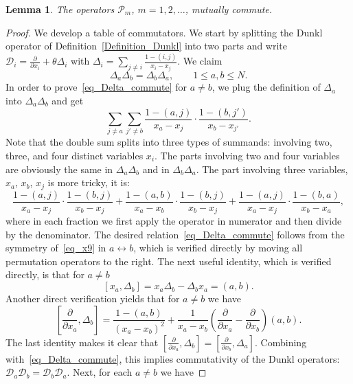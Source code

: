 \documentclass[11pt]{article}
\newtheorem{lemma}[theo]{Lemma}
\theoremstyle{definition}
\numberwithin{equation}{section}
\newcommand{\D}{\mathcal D}
\newcommand{\PP}{\mathcal P}
\begin{document}
\begin{lemma} \label{Lemma_commute}
 The operators $\PP_m$, $m=1,2,\dots$, mutually commute.
\end{lemma}
\begin{proof}
 We develop a table of commutators. We start by splitting the Dunkl operator of Definition~\ref{Definition_Dunkl} into two parts and write $\D_i=\frac{\partial}{\partial x_i} + \theta \Delta_i$ with $\Delta_i=\sum_{j\ne i} \frac{1-(i,j)}{x_i-x_j}$.
 We claim
 \begin{equation}
 \label{eq_Delta_commute}
  \Delta_a \Delta_b = \Delta_b \Delta_a,\qquad 1\le a,b \le N.
 \end{equation}
 In order to prove~\eqref{eq_Delta_commute} for $a\ne b$, we plug the definition of $\Delta_a$ into $\Delta_a\Delta_b$ and get
 $$
  \sum_{j\ne a} \sum_{j'\ne b} \frac{1-(a,j)}{x_a-x_j} \cdot \frac{1-(b,{j'})}{x_b-x_{j'}}.
 $$
 Note that the double sum splits into three types of summands: involving two, three, and four distinct variables $x_i$. The parts involving two and four variables are obviously the same in $\Delta_a \Delta_b$ and in $\Delta_b \Delta_a$. The part involving three variables, $x_a$, $x_b$, $x_j$ is more tricky, it is:
 \begin{equation}
 \label{eq_x9}
  \frac{1-(a,j)}{x_a-x_j} \cdot  \frac{1-(b,j)}{x_b-x_j} +   \frac{1-(a,b)}{x_a-x_b} \cdot  \frac{1-(b,j)}{x_b-x_j} +   \frac{1-(a,j)}{x_a-x_j} \cdot  \frac{1-(b,a)}{x_b-x_a},
 \end{equation}
 where in each fraction we first apply the operator in numerator and then divide by the denominator. The desired relation~\eqref{eq_Delta_commute} follows from the symmetry of~\eqref{eq_x9} in $a\leftrightarrow b$, which is verified directly by moving all permutation operators to the right.
 The next useful identity, which is verified directly, is that for $a\ne b$
 \begin{equation}
 \label{eq_x14}
  [x_a,\Delta_b]=x_a \Delta_b- \Delta_b x_a=(a,b).
 \end{equation}
 Another direct verification yields that for $a\ne b$ we have
 \begin{equation} \label{eq_x15}
  \left[\frac{\partial}{\partial x_a},\Delta_b\right]=\frac{1-(a,b)}{(x_a-x_b)^2} +\frac{1}{x_a-x_b} \left(\frac{\partial}{\partial x_a}-\frac{\partial}{\partial x_b}\right) (a,b).
 \end{equation}
 The last identity makes it clear that $\left[\tfrac{\partial}{\partial x_a},\Delta_b\right]= \left[\tfrac{\partial}{\partial x_b},\Delta_a\right]$. Combining with~\eqref{eq_Delta_commute}, this implies commutativity of the Dunkl operators: $\D_a \D_b=\D_b \D_a$. Next, for each $ a \ne b $ we have

\end{proof}
\end{document}
